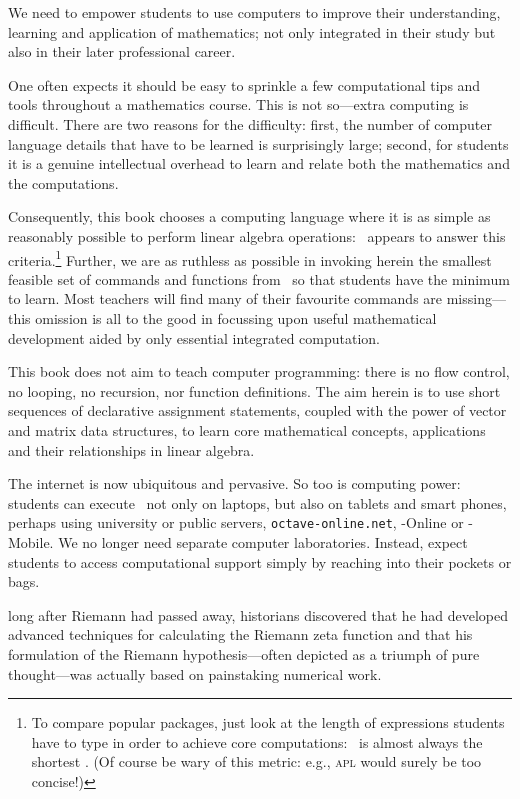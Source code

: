 We need to empower students to use computers to improve their understanding, learning and application of mathematics; not only integrated in their study but also in their later professional career.

One often expects it should be easy to sprinkle a few computational tips and tools throughout a mathematics course.
This is not so---extra computing is difficult.
There are two reasons for the difficulty: 
first, the number of computer language details that have to be learned is surprisingly large;
second, for students it is a genuine intellectual overhead to learn and relate both the mathematics and the computations.

Consequently, this book chooses a computing language where it is as simple as reasonably possible to perform linear algebra operations: \script\ appears to answer this criteria.\footnote{To compare popular packages, just look at the length of expressions students have to type in order to achieve core computations: \script\ is almost always the shortest \cite[e.g.]{Nakos1998}.  
(Of course be wary of this metric: e.g., \textsc{apl} would surely be too concise!)}
Further, we are as ruthless as possible in invoking herein the smallest feasible set of commands and functions from \script\ so that  students have the minimum to learn.
Most teachers will find many of their favourite commands are missing---this omission is all to the good in focussing upon useful mathematical development aided by only essential integrated computation.

This book does not aim to teach computer programming: there is no flow control, no looping, no recursion, nor function definitions.
The aim herein is to use short sequences of declarative assignment statements, coupled with the power of vector and matrix data structures, to learn core mathematical concepts, applications and their relationships in linear algebra. 

The internet is now ubiquitous and pervasive. 
So too is computing power: students can execute \script\ not only on laptops, but also on tablets and smart phones, perhaps using university or public servers, \verb|octave-online.net|, \script[1]-Online or \script[1]-Mobile. 
We no longer need separate computer laboratories.
Instead, expect students to access computational support simply by reaching into their pockets or bags.

\begin{quoted}{\cite{Donoho2015}}
long after Riemann had passed away, historians discovered that he had developed advanced techniques for calculating the Riemann zeta function and that his formulation of the Riemann hypothesis---often depicted as a triumph of pure thought---was actually based on painstaking numerical work.
\end{quoted}







